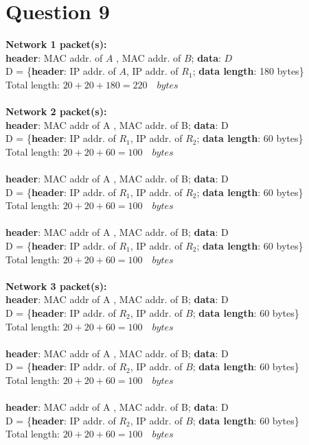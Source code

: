 \documentclass[12pt,letterpaper]{article}
\begin{document}
\section*{Question 9}

	\textbf{Network 1 packet(s):} \\
	\lbrack \textbf{header}: MAC addr. of $ A $ , MAC addr. of $ B $; \textbf{data}: $ D $\rbrack \\
	D = \{\textbf{header}:  IP addr. of $ A $, IP addr. of $ R_{1} $; \textbf{data length}: 180 bytes\} \\
	Total length: $20+20+180=220 \quad bytes$ \\ \\
	
	\textbf{Network 2 packet(s):} \\
	\lbrack \textbf{header}: MAC addr of A , MAC addr. of B; \textbf{data}: D\rbrack \\
	D = \{\textbf{header}:  IP addr. of $ R_{1} $, IP addr. of $ R_{2} $; \textbf{data length}: 60 bytes\} \\
	Total length: $20+20+60=100 \quad bytes$ \\ \\
	\lbrack \textbf{header}: MAC addr of A , MAC addr. of B; \textbf{data}: D\rbrack \\
	D = \{\textbf{header}:  IP addr. of $ R_{1} $, IP addr. of $ R_{2} $; \textbf{data length}: 60 bytes\} \\
	Total length: $20+20+60=100 \quad bytes$ \\ \\
	\lbrack \textbf{header}: MAC addr of A , MAC addr. of B; \textbf{data}: D\rbrack \\
	D = \{\textbf{header}:  IP addr. of $ R_{1} $, IP addr. of $ R_{2} $; \textbf{data length}: 60 bytes\} \\
	Total length: $20+20+60=100 \quad bytes$ \\ \\
	
	\textbf{Network 3 packet(s):} \\
	\lbrack \textbf{header}: MAC addr of A , MAC addr. of B; \textbf{data}: D\rbrack \\
	D = \{\textbf{header}:  IP addr. of $ R_{2} $, IP addr. of $ B $; \textbf{data length}: 60 bytes\} \\
	Total length: $20+20+60=100 \quad bytes$ \\ \\
	\lbrack \textbf{header}: MAC addr of A , MAC addr. of B; \textbf{data}: D\rbrack \\
	D = \{\textbf{header}:  IP addr. of $ R_{2} $, IP addr. of $ B $; \textbf{data length}: 60 bytes\} \\
	Total length: $20+20+60=100 \quad bytes$ \\ \\
	\lbrack \textbf{header}: MAC addr of A , MAC addr. of B; \textbf{data}: D\rbrack \\
	D = \{\textbf{header}:  IP addr. of $ R_{2} $, IP addr. of $ B $; \textbf{data length}: 60 bytes\} \\
	Total length: $20+20+60=100 \quad bytes$ \\ \\
\end{document}
